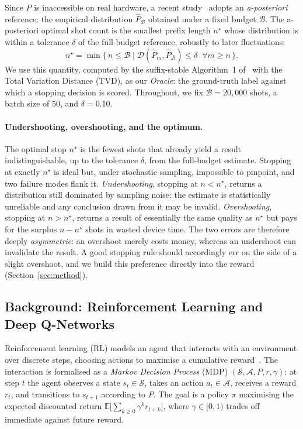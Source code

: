 \documentclass[runningheads]{llncs}
\begin{document}
Since $P$ is inaccessible on real hardware, a recent
study~\cite{bisicchia2026shots} adopts an \emph{a-posteriori} reference: the
empirical distribution $\hat{P}_{\mathcal{B}}$ obtained under a fixed budget
$\mathcal{B}$. The a-posteriori optimal shot count is the smallest prefix length
$n^{\star}$ whose distribution is within a tolerance $\delta$ of the full-budget
reference, robustly to later fluctuations:
\begin{equation}
  n^{\star} = \min\bigl\{\, n \le \mathcal{B} \;\big|\;
  \mathcal{D}(\hat{P}_m, \hat{P}_{\mathcal{B}}) \le \delta \;\;\forall m \ge n \,\bigr\}.
  \label{eq:oracle}
\end{equation}
We use this quantity, computed by the suffix-stable Algorithm~1
of~\cite{bisicchia2026shots} with the Total Variation Distance (TVD), as our
\emph{Oracle}: the ground-truth label against which a stopping decision is
scored. Throughout, we fix $\mathcal{B}=20{,}000$ shots, a batch size of $50$,
and $\delta=0.10$.

\paragraph{Undershooting, overshooting, and the optimum.} The optimal stop
$n^{\star}$ is the fewest shots that already yield a result indistinguishable, up
to the tolerance $\delta$, from the full-budget estimate. Stopping at exactly
$n^{\star}$ is ideal but, under stochastic sampling, impossible to pinpoint, and
two failure modes flank it. \emph{Undershooting}, stopping at $n<n^{\star}$,
returns a distribution still dominated by sampling noise: the estimate is
statistically unreliable and any conclusion drawn from it may be invalid.
\emph{Overshooting}, stopping at $n>n^{\star}$, returns a result of essentially
the same quality as $n^{\star}$ but pays for the surplus $n-n^{\star}$ shots in
wasted device time. The two errors are therefore deeply \emph{asymmetric}: an
overshoot merely costs money, whereas an undershoot can invalidate the result.
A good stopping rule should accordingly err on the side of a slight overshoot,
and we build this preference directly into the reward (Section~\ref{sec:method}).

\subsection{Background: Reinforcement Learning and Deep Q-Networks}
\label{sec:background-dl}

Reinforcement learning (RL) models an agent that interacts with an environment
over discrete steps, choosing actions to maximise a cumulative
reward~\cite{sutton2018reinforcement}. The interaction is formalised as a
\emph{Markov Decision Process} (MDP) $(\mathcal{S},\mathcal{A},P,r,\gamma)$:
at step $t$ the agent observes a state $s_t\in\mathcal{S}$, takes an action
$a_t\in\mathcal{A}$, receives a reward $r_t$, and transitions to $s_{t+1}$
according to $P$. The goal is a policy $\pi$ maximising the expected discounted
return $\mathbb{E}\bigl[\sum_{k\ge 0}\gamma^{k} r_{t+k}\bigr]$, where
$\gamma\in[0,1)$ trades off immediate against future reward.
\end{document}

